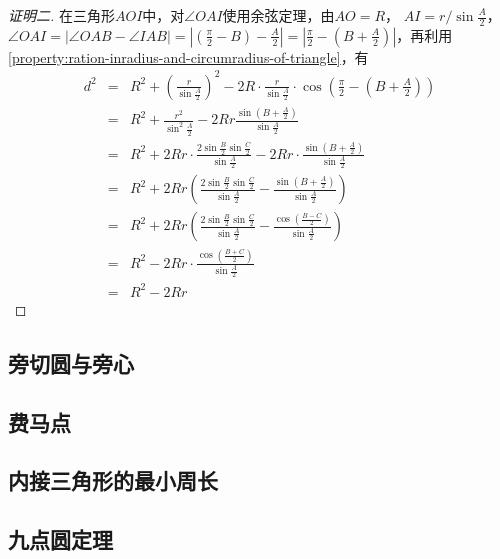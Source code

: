 \begin{proof}[证明二]
  在三角形$AOI$中，对$\angle OAI$使用余弦定理，由$AO=R$， $AI=r/\sin{\frac{A}{2}}$，$\angle OAI = \left| \angle OAB - \angle IAB \right| = \left| \left( \frac{\pi}{2}-B \right) - \frac{A}{2} \right| = \left| \frac{\pi}{2} - \left( B+\frac{A}{2} \right) \right|$，再利用\autoref{property:ration-inradius-and-circumradius-of-triangle}，有
  \begin{eqnarray*}
    d^2 & = & R^2+\left( \frac{r}{\sin{\frac{A}{2}}} \right)^2 - 2R \cdot \frac{r}{\sin{\frac{A}{2}}} \cdot \cos{\left( \frac{\pi}{2}-\left( B+\frac{A}{2} \right) \right)} \\
        & = & R^2 + \frac{r^2}{\sin^2 \frac{A}{2}} -2Rr \frac{\sin{\left( B+\frac{A}{2} \right)}}{\sin{\frac{A}{2}}} \\
    & = & R^2 + 2Rr \cdot \frac{2\sin{\frac{B}{2}}\sin{\frac{C}{2}}}{\sin{\frac{A}{2}}}-2Rr \cdot \frac{\sin{\left( B+\frac{A}{2} \right)}}{\sin{\frac{A}{2}}} \\
        & = & R^2 + 2Rr \left( \frac{2\sin{\frac{B}{2}}\sin{\frac{C}{2}}}{\sin{\frac{A}{2}}} - \frac{\sin{\left( B+\frac{A}{2} \right)}}{\sin{\frac{A}{2}}} \right) \\
        & = & R^2 + 2Rr \left( \frac{2\sin{\frac{B}{2}}\sin{\frac{C}{2}}}{\sin{\frac{A}{2}}} - \frac{\cos{\left( \frac{B-C}{2} \right)}}{\sin{\frac{A}{2}}} \right) \\
        & = & R^2 - 2Rr \cdot \frac{\cos{\left( \frac{B+C}{2} \right)}}{\sin{\frac{A}{2}}} \\
    & = & R^2 - 2Rr
  \end{eqnarray*}
\end{proof}

\subsection{旁切圆与旁心}
\label{sec:escenter}

\subsection{费马点}
\label{sec:fermat-point-of-triangle}

\subsection{内接三角形的最小周长}
\label{sec:min-girth-of-triangle-in-other}

\subsection{九点圆定理}
\label{sec:nine-point-theorem-of-triangle}




